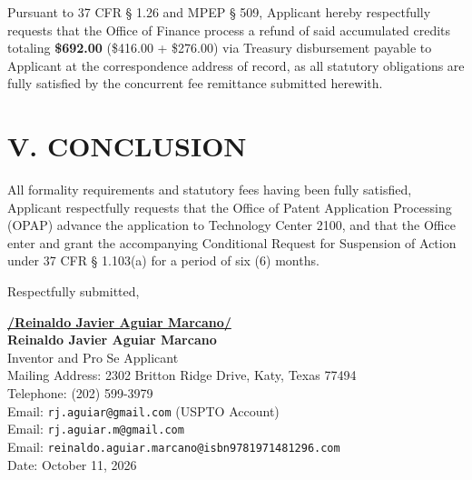 \documentclass[11pt,letterpaper]{article}
\begin{document}
Pursuant to 37 CFR \S{} 1.26 and MPEP \S{} 509, Applicant hereby respectfully requests that the Office of Finance process a refund of said accumulated credits totaling \textbf{\$692.00} (\$416.00 + \$276.00) via Treasury disbursement payable to Applicant at the correspondence address of record, as all statutory obligations are fully satisfied by the concurrent fee remittance submitted herewith.

\section*{V. CONCLUSION}

All formality requirements and statutory fees having been fully satisfied, Applicant respectfully requests that the Office of Patent Application Processing (OPAP) advance the application to Technology Center 2100, and that the Office enter and grant the accompanying Conditional Request for Suspension of Action under 37 CFR \S{} 1.103(a) for a period of six (6) months.

\vspace{0.6cm}
\begin{singlespace}
\noindent Respectfully submitted, \par\vspace{0.8cm}
\underline{\textbf{/Reinaldo Javier Aguiar Marcano/}} \\
\textbf{Reinaldo Javier Aguiar Marcano} \\
Inventor and Pro Se Applicant \\
Mailing Address: 2302 Britton Ridge Drive, Katy, Texas 77494 \\
Telephone: (202) 599-3979 \\
Email: \texttt{rj.aguiar@gmail.com} (USPTO Account) \\
Email: \texttt{rj.aguiar.m@gmail.com} \\
Email: \texttt{reinaldo.aguiar.marcano@isbn9781971481296.com} \\
Date: October 11, 2026
\end{singlespace}
\end{document}
